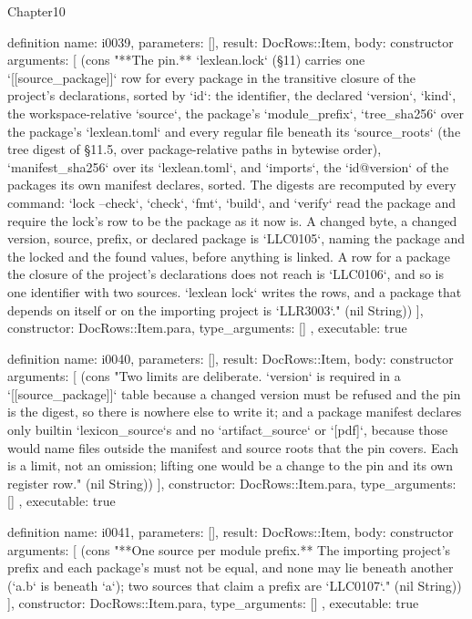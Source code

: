 \begin{lexlean}{Chapter10}
\begin{semanticmodule}
definition{
  name: i0039,
  parameters: [],
  result: DocRows::Item,
  body: constructor{
    arguments: [
      (cons "**The pin.** `lexlean.lock` (§11) carries one `[[source_package]]` row for every package in the transitive closure of the project's declarations, sorted by `id`: the identifier, the declared `version`, `kind`, the workspace-relative `source`, the package's `module_prefix`, `tree_sha256` over the package's `lexlean.toml` and every regular file beneath its `source_roots` (the tree digest of §11.5, over package-relative paths in bytewise order), `manifest_sha256` over its `lexlean.toml`, and `imports`, the `id@version` of the packages its own manifest declares, sorted. The digests are recomputed by every command: `lock --check`, `check`, `fmt`, `build`, and `verify` read the package and require the lock's row to be the package as it now is. A changed byte, a changed version, source, prefix, or declared package is `LLC0105`, naming the package and the locked and the found values, before anything is linked. A row for a package the closure of the project's declarations does not reach is `LLC0106`, and so is one identifier with two sources. `lexlean lock` writes the rows, and a package that depends on itself or on the importing project is `LLR3003`." (nil String))
    ],
    constructor: DocRows::Item.para,
    type_arguments: []
  },
  executable: true
}

definition{
  name: i0040,
  parameters: [],
  result: DocRows::Item,
  body: constructor{
    arguments: [
      (cons "Two limits are deliberate. `version` is required in a `[[source_package]]` table because a changed version must be refused and the pin is the digest, so there is nowhere else to write it; and a package manifest declares only builtin `lexicon_source`s and no `artifact_source` or `[pdf]`, because those would name files outside the manifest and source roots that the pin covers. Each is a limit, not an omission; lifting one would be a change to the pin and its own register row." (nil String))
    ],
    constructor: DocRows::Item.para,
    type_arguments: []
  },
  executable: true
}

definition{
  name: i0041,
  parameters: [],
  result: DocRows::Item,
  body: constructor{
    arguments: [
      (cons "**One source per module prefix.** The importing project's prefix and each package's must not be equal, and none may lie beneath another (`a.b` is beneath `a`); two sources that claim a prefix are `LLC0107`." (nil String))
    ],
    constructor: DocRows::Item.para,
    type_arguments: []
  },
  executable: true
}


\end{semanticmodule}
\end{lexlean}

